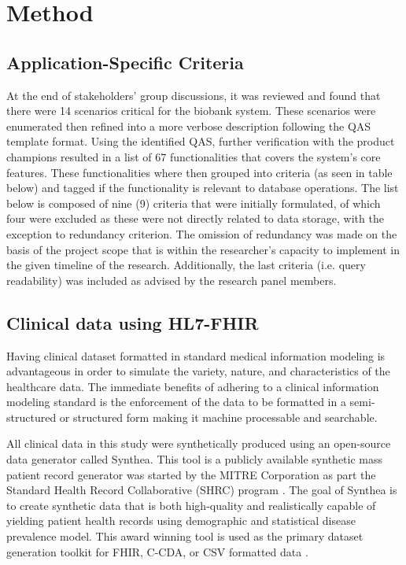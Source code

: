 \documentclass[5p]{elsarticle}
\begin{document}
\section{Method}

\subsection{Application-Specific Criteria}
At the end of stakeholders’ group discussions, it was reviewed and found that there were 14 scenarios critical for the biobank system. These scenarios were enumerated then refined into a more verbose description following the QAS template format. Using the identified QAS, further verification with the product champions resulted in a list of 67 functionalities that covers the system’s core features. These functionalities where then grouped into criteria (as seen in table below) and tagged if the functionality is relevant to database operations. The list below is composed of nine (9) criteria that were initially formulated, of which four were excluded as these were not directly related to data storage, with the exception to redundancy criterion. The omission of redundancy was made on the basis of the project scope that is within the researcher’s capacity to implement in the given timeline of the research. Additionally, the last criteria (i.e. query readability) was included as advised by the research panel members.

\subsection{Clinical data using HL7-FHIR}
Having clinical dataset formatted in standard medical information modeling is advantageous in order to simulate the variety, nature, and characteristics of the healthcare data. 
The immediate benefits of adhering to a clinical information modeling standard is the enforcement of the data 
to be formatted in a semi-structured or structured form making it machine processable \cite{G.Weglarz200419} and searchable.

All clinical data in this study were synthetically produced using an open-source data generator called
Synthea. This tool is a publicly available synthetic mass patient record generator was started by the MITRE Corporation as
part the Standard Health Record Collaborative (SHRC) program \cite{J.Walonoski2018230}. 
The goal of Synthea is to create synthetic data that is both high-quality and realistically capable of yielding patient health 
records using demographic and statistical disease prevalence model. This award winning \cite{HealthDataManagement2017} tool
is used as the primary dataset generation toolkit for FHIR, C-CDA, or CSV formatted data \cite{J.C.M2016899}.
\end{document}
